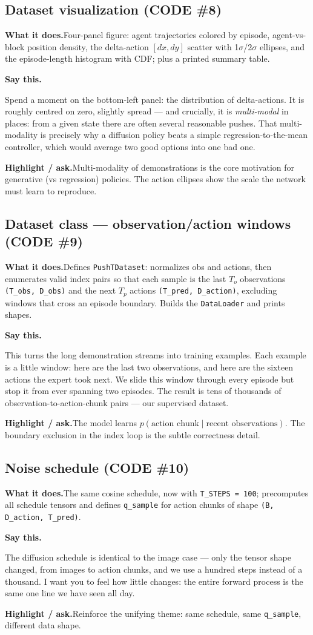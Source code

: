 \documentclass[11pt]{article}
\newenvironment{saythis}{%
  \par\smallskip\noindent
  \begin{list}{}{%
    \setlength{\leftmargin}{1.2em}%
    \setlength{\rightmargin}{0.5em}%
    \setlength{\topsep}{2pt}%
  }\item\relax
  \color{sayrule}\textbf{Say this.}\hspace{0.4em}\color{black}\itshape
}{%
  \end{list}\par\smallskip
}
\newcommand{\highlight}[1]{\par\smallskip\noindent\textcolor{hlcolor}{\textbf{Highlight / ask.}}\hspace{0.4em}#1\par\smallskip}
\newcommand{\whatdoes}[1]{\par\noindent\textbf{What it does.}\hspace{0.4em}#1\par}
\begin{document}
\subsection{Dataset visualization (CODE \#8)}
\whatdoes{Four-panel figure: agent trajectories colored by episode, agent-vs-block position density, the
delta-action $[dx,dy]$ scatter with 1$\sigma$/2$\sigma$ ellipses, and the episode-length histogram with
CDF; plus a printed summary table.}
\begin{saythis}
Spend a moment on the bottom-left panel: the distribution of delta-actions. It is roughly centred on
zero, slightly spread --- and crucially, it is \emph{multi-modal} in places: from a given state there are
often several reasonable pushes. That multi-modality is precisely why a diffusion policy beats a simple
regression-to-the-mean controller, which would average two good options into one bad one.
\end{saythis}
\highlight{Multi-modality of demonstrations is the core motivation for generative (vs regression)
policies. The action ellipses show the scale the network must learn to reproduce.}

\subsection{Dataset class --- observation/action windows (CODE \#9)}
\whatdoes{Defines \texttt{PushTDataset}: normalizes obs and actions, then enumerates valid index pairs so
that each sample is the last $T_o$ observations \texttt{(T\_obs, D\_obs)} and the next $T_p$ actions
\texttt{(T\_pred, D\_action)}, excluding windows that cross an episode boundary. Builds the
\texttt{DataLoader} and prints shapes.}
\begin{saythis}
This turns the long demonstration streams into training examples. Each example is a little window: here
are the last two observations, and here are the sixteen actions the expert took next. We slide this
window through every episode but stop it from ever spanning two episodes. The result is tens of
thousands of observation-to-action-chunk pairs --- our supervised dataset.
\end{saythis}
\highlight{The model learns $p(\text{action chunk} \mid \text{recent observations})$. The boundary
exclusion in the index loop is the subtle correctness detail.}

\subsection{Noise schedule (CODE \#10)}
\whatdoes{The same cosine schedule, now with \texttt{T\_STEPS = 100}; precomputes all schedule tensors and
defines \texttt{q\_sample} for action chunks of shape \texttt{(B, D\_action, T\_pred)}.}
\begin{saythis}
The diffusion schedule is identical to the image case --- only the tensor shape changed, from images to
action chunks, and we use a hundred steps instead of a thousand. I want you to feel how little changes:
the entire forward process is the same one line we have seen all day.
\end{saythis}
\highlight{Reinforce the unifying theme: same schedule, same \texttt{q\_sample}, different data shape.}
\end{document}
